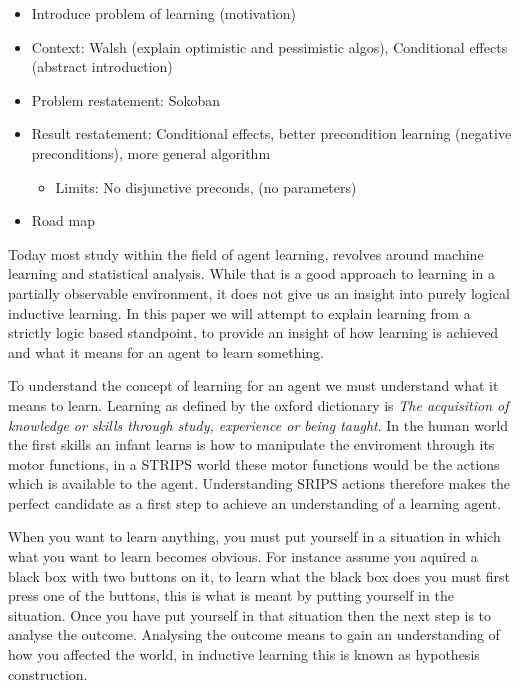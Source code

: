 \documentclass[Master.tex]{subfiles}
\begin{document}
	\begin{itemize}
		\item Introduce problem of learning (motivation)
		\item Context: Walsh (explain optimistic and pessimistic algos), Conditional effects (abstract introduction)
		\item Problem restatement: Sokoban
		\item Result restatement: Conditional effects, better precondition learning (negative preconditions), more general algorithm
		\begin{itemize}
			\item Limits: No disjunctive preconds, (no parameters)
		\end{itemize}
		\item Road map
	\end{itemize}

	Today most study within the field of agent learning, revolves around
	machine learning and statistical analysis. While that is a good approach
	to learning in a partially observable environment, it does not give
	us an insight into purely logical inductive learning. In this paper
	we will attempt to explain learning from a strictly logic based standpoint,
	to provide an insight of how learning is achieved and what it means
	for an agent to learn something.

	To understand the concept of learning for an agent we must understand
	what it means to learn. Learning as defined by the oxford dictionary
	is \emph{The acquisition of knowledge or skills through study, experience
		or being taught}. In the human world the first skills an infant learns
	is how to manipulate the enviroment through its motor functions, in
	a STRIPS world these motor functions would be the actions which is
	available to the agent. Understanding SRIPS actions therefore makes
	the perfect candidate as a first step to achieve an understanding
	of a learning agent.

	When you want to learn anything, you must put yourself in a situation
	in which what you want to learn becomes obvious. For instance assume
	you aquired a black box with two buttons on it, to learn what the
	black box does you must first press one of the buttons, this is what
	is meant by putting yourself in the situation. Once you have put yourself
	in that situation then the next step is to analyse the outcome. Analysing
	the outcome means to gain an understanding of how you affected the
	world, in inductive learning this is known as hypothesis construction.
\end{document}
